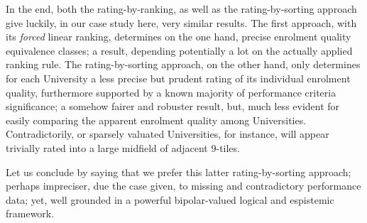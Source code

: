 In the end, both the \Copeland rating-by-ranking, as well as the rating-by-sorting approach give luckily, in our case study here, very similar results. The first approach, with its \emph{forced} linear ranking, determines on the one hand, precise enrolment quality equivalence classes; a result, depending potentially a lot on the actually applied ranking rule. The rating-by-sorting approach, on the other hand, only determines for each University a less precise but prudent rating of its individual enrolment quality, furthermore supported by a known majority of performance criteria significance; a somehow fairer and robuster result, but, much less evident for easily comparing the apparent enrolment quality among Universities. Contradictorily, or sparsely valuated Universities, for instance, will appear trivially rated into a large midfield of adjacent 9-tiles.

Let us conclude by saying that we prefer this latter rating-by-sorting approach; perhaps impreciser, due the case given, to missing and contradictory performance data; yet, well grounded in a powerful bipolar-valued logical and espistemic framework.
 
